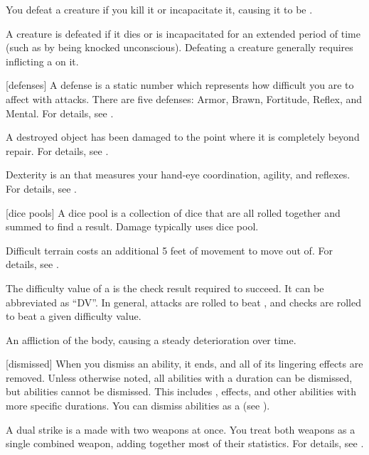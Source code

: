  You defeat a creature if you kill it or incapacitate it, causing it to be .

 A creature is defeated if it dies or is incapacitated for an extended period of time (such as by being knocked unconscious).
Defeating a creature generally requires inflicting a  on it.

[defenses] A defense is a static number which represents how difficult you are to affect with attacks.
There are five defenses: Armor, Brawn, Fortitude, Reflex, and Mental.
For details, see .

 A destroyed object has been damaged to the point where it is completely beyond repair.
For details, see .

 Dexterity is an  that measures your hand-eye coordination, agility, and reflexes.
For details, see .

[dice pools] A dice pool is a collection of dice that are all rolled together and summed to find a result.
Damage typically uses dice pool.

 Difficult terrain costs an additional 5 feet of movement to move out of.
For details, see .

 The difficulty value of a  is the check result required to succeed.
It can be abbreviated as ``DV''.
In general, attacks are rolled to beat , and checks are rolled to beat a given difficulty value.

 An affliction of the body, causing a steady deterioration over time.

[dismissed] When you dismiss an ability, it ends, and all of its lingering effects are removed.
Unless otherwise noted, all \magical abilities with a duration can be dismissed, but  abilities cannot be dismissed.
This includes ,  effects, and other abilities with more specific durations.
You can dismiss abilities as a  (see ).

 A dual strike is a  made with two weapons at once.
You treat both weapons as a single combined weapon, adding together most of their statistics.
For details, see .

